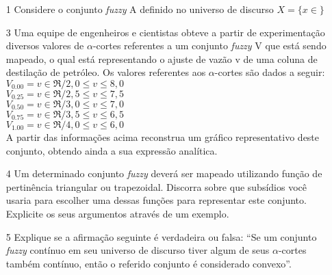 \documentclass{report}
\begin{document}
\newpage

\begin{enumerate}

\item[1] Considere o conjunto \emph{fuzzy} A definido no universo de discurso $X = \{ x \in  \}$



\item[3] Uma equipe de engenheiros e cientistas obteve a partir de experimentação diversos valores de
$\alpha$-cortes referentes a um conjunto \emph{fuzzy} V que está sendo mapeado, o qual está representando o
ajuste de vazão v de uma coluna de destilação de petróleo. Os valores referentes aos $\alpha$-cortes são
dados a seguir:\\
$V_{0.00} = {v \in \Re / 2,0 \leq v \leq 8,0}$\\
$V_{0.25} = {v \in \Re / 2,5 \leq v \leq 7,5}$\\
$V_{0.50} = {v \in \Re / 3,0 \leq v \leq 7,0}$\\
$V_{0.75} = {v \in \Re / 3,5 \leq v \leq 6,5}$\\
$V_{1.00} = {v \in \Re / 4,0 \leq v \leq 6,0}$\\
A partir das informações acima reconstrua um gráfico representativo deste conjunto, obtendo
ainda a sua expressão analítica.


\item[4] Um determinado conjunto \emph{fuzzy} deverá ser mapeado utilizando função de pertinência
triangular ou trapezoidal. Discorra sobre que subsídios você usaria para escolher uma dessas
funções para representar este conjunto. Explicite os seus argumentos através de um exemplo.


\item[5] Explique se a afirmação seguinte é verdadeira ou falsa: “Se um conjunto \emph{fuzzy} contínuo em
seu universo de discurso tiver algum de seus $\alpha$-cortes também contínuo, então o referido
conjunto é considerado convexo”.

\end{enumerate}
\end{document}
